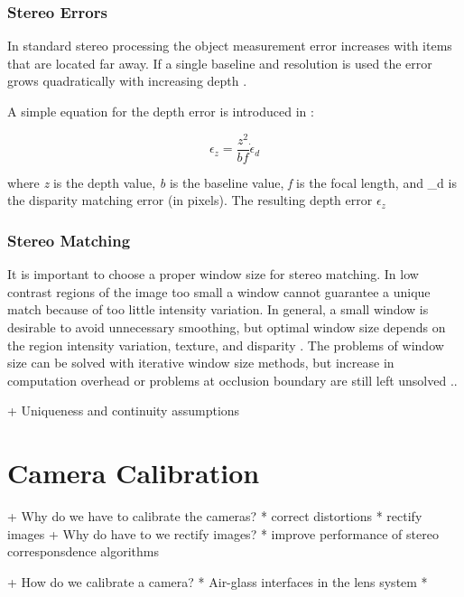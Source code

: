 \documentclass[12pt,a4paper,oneside,pdftex]{report}
\begin{document}
\subsubsection{Stereo Errors}

In standard stereo processing the object measurement error increases with items that are located far away. If a single baseline and resolution is used the error grows quadratically with increasing depth \cite{Gallup08}.

A simple equation for the depth error is introduced in \cite{Gallup08}:

\begin{equation}
\epsilon_z = \frac{z^2}{bf}\dot \epsilon_d
\end{equation}

where \emph{z} is the depth value, \emph{b} is the baseline value, \emph{f} is the focal length, and \epsilon_d is the disparity matching error (in pixels). The resulting depth error $\epsilon_z$ 



\subsubsection{Stereo Matching}

It is important to choose a proper window size for stereo matching. In low contrast regions of the image too small a window cannot guarantee a unique match because of too little intensity variation. 
In general, a small window is desirable to avoid unnecessary smoothing, but optimal window size depends on the region intensity variation, texture, and disparity \cite{Zitnick00}.
The problems of window size can be solved with iterative window size methods, but increase in computation overhead or problems at occlusion boundary are still left unsolved \cite{Zitnick00}..


+ Uniqueness and continuity assumptions

\section{Camera Calibration}

+ Why do we have to calibrate the cameras?
    * correct distortions
    * rectify images
        + Why do have to we rectify images?
    * improve performance of stereo corresponsdence algorithms
    
+ How do we calibrate a camera?
    * Air-glass interfaces in the lens system
    * 
\end{document}
